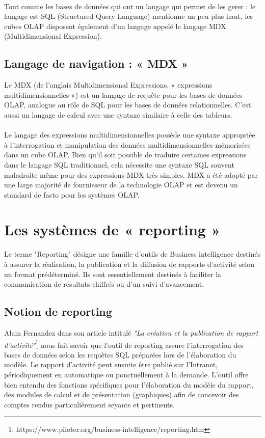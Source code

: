 \paragraph{}
Tout comme les bases de données qui ont un langage qui permet de les gerer : le langage est SQL (Structured Query Language) mentionne un peu plus haut, les cubes OLAP disposent également d’un langage appelé le langage MDX (Multidimensional Expression).


\subsection{Langage de navigation : « MDX »}
Le MDX (de l'anglais Multidimensional Expressions, « expressions multidimensionnelles ») est un langage de requête pour les bases de données OLAP, analogue au rôle de SQL pour les bases de données relationnelles. C'est aussi un langage de calcul avec une syntaxe similaire à celle des tableurs.
\paragraph{}
Le langage des expressions multidimensionnelles possède une syntaxe appropriée à l'interrogation et manipulation des données multidimensionnelles mémorisées dans un cube OLAP. Bien qu'il soit possible de traduire certaines expressions dans le langage SQL traditionnel, cela nécessite une syntaxe SQL souvent maladroite même pour des expressions MDX très simples. MDX a été adopté par une large majorité de fournisseur de la technologie OLAP et est devenu un standard de facto pour les systèmes OLAP.


\section{Les systèmes de « reporting »}
Le terme "Reporting" désigne une famille d'outils de Business intelligence destinés à assurer la réalisation, la publication et la diffusion de rapports d'activité selon un format prédéterminé. Ils sont essentiellement destinés à faciliter la communication de résultats chiffrés ou d'un suivi d'avancement.

\subsection{Notion de reporting}
Alain Fernandez dans son article intitulé \textit{"La création et la publication de rapport d'activité"}\footnote{https://www.piloter.org/business-intelligence/reporting.htm} nous fait savoir que l'outil de reporting assure l'interrogation des bases de données selon les requêtes SQL préparées lors de l'élaboration du modèle. Le rapport d'activité peut ensuite être publié sur l'Intranet, périodiquement en automatique ou ponctuellement à la demande. L'outil offre bien entendu des fonctions spécifiques pour l'élaboration du modèle du rapport, des modules de calcul et de présentation (graphiques) afin de concevoir des comptes rendus particulièrement seyants et pertinents.
